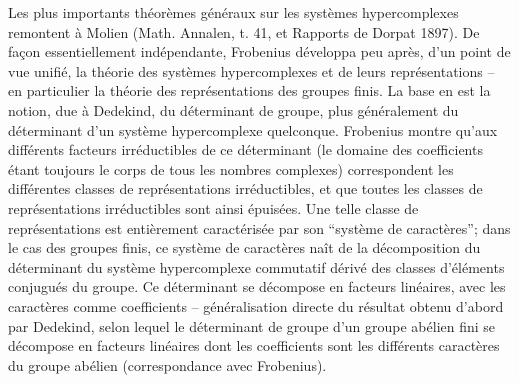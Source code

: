 Les plus importants théorèmes généraux sur les systèmes hypercomplexes remontent à Molien (Math. Annalen, t. 41, et Rapports de Dorpat 1897). De façon essentiellement indépendante, Frobenius développa peu après, d'un point de vue unifié, la théorie des systèmes hypercomplexes et de leurs représentations -- en particulier la théorie des représentations des groupes finis. La base en est la notion, due à Dedekind, du déterminant de groupe, plus généralement du déterminant d'un système hypercomplexe quelconque. Frobenius montre qu'aux différents facteurs irréductibles de ce déterminant (le domaine des coefficients étant toujours le corps de tous les nombres complexes) correspondent les différentes classes de représentations irréductibles, et que toutes les classes de représentations irréductibles sont ainsi épuisées. Une telle classe de représentations est entièrement caractérisée par son ``système de caractères''; dans le cas des groupes finis, ce système de caractères naît de la décomposition du déterminant du système hypercomplexe commutatif dérivé des classes d'éléments conjugués du groupe. Ce déterminant se décompose en facteurs linéaires, avec les caractères comme coefficients -- généralisation directe du résultat obtenu d'abord par Dedekind, selon lequel le déterminant de groupe d'un groupe abélien fini se décompose en facteurs linéaires dont les coefficients sont les différents caractères du groupe abélien (correspondance avec Frobenius).


